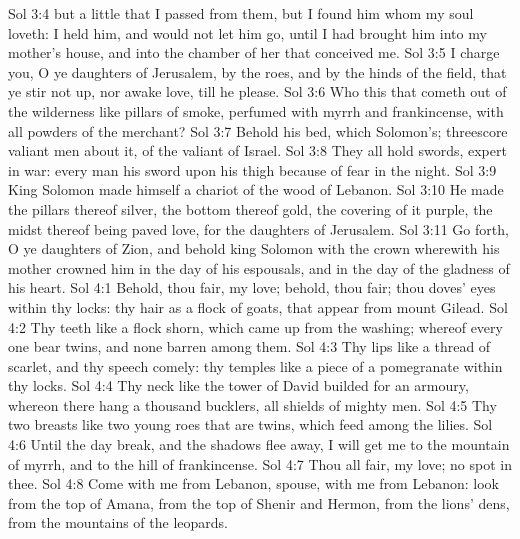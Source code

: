 \vs Sol 3:4  but a little that I passed from them, but I found him whom my soul loveth: I held him, and would not let him go, until I had brought him into my mother's house, and into the chamber of her that conceived me.
\vs Sol 3:5 I charge you, O ye daughters of Jerusalem, by the roes, and by the hinds of the field, that ye stir not up, nor awake  love, till he please.
\vs Sol 3:6 Who  this that cometh out of the wilderness like pillars of smoke, perfumed with myrrh and frankincense, with all powders of the merchant?
\vs Sol 3:7 Behold his bed, which  Solomon's; threescore valiant men  about it, of the valiant of Israel.
\vs Sol 3:8 They all hold swords,  expert in war: every man  his sword upon his thigh because of fear in the night.
\vs Sol 3:9 King Solomon made himself a chariot of the wood of Lebanon.
\vs Sol 3:10 He made the pillars thereof  silver, the bottom thereof  gold, the covering of it  purple, the midst thereof being paved  love, for the daughters of Jerusalem.
\vs Sol 3:11 Go forth, O ye daughters of Zion, and behold king Solomon with the crown wherewith his mother crowned him in the day of his espousals, and in the day of the gladness of his heart.
\vs Sol 4:1 Behold, thou  fair, my love; behold, thou  fair; thou  doves' eyes within thy locks: thy hair  as a flock of goats, that appear from mount Gilead.
\vs Sol 4:2 Thy teeth  like a flock  shorn, which came up from the washing; whereof every one bear twins, and none  barren among them.
\vs Sol 4:3 Thy lips  like a thread of scarlet, and thy speech  comely: thy temples  like a piece of a pomegranate within thy locks.
\vs Sol 4:4 Thy neck  like the tower of David builded for an armoury, whereon there hang a thousand bucklers, all shields of mighty men.
\vs Sol 4:5 Thy two breasts  like two young roes that are twins, which feed among the lilies.
\vs Sol 4:6 Until the day break, and the shadows flee away, I will get me to the mountain of myrrh, and to the hill of frankincense.
\vs Sol 4:7 Thou  all fair, my love;  no spot in thee.
\vs Sol 4:8 Come with me from Lebanon,  spouse, with me from Lebanon: look from the top of Amana, from the top of Shenir and Hermon, from the lions' dens, from the mountains of the leopards.
